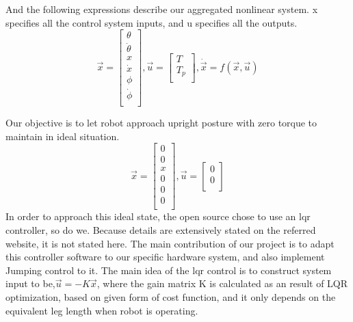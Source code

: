 \documentclass[12pt]{article}
\begin{document}
            And the following expressions describe our aggregated nonlinear system. x specifies all the control system inputs, and u specifies all the outputs.
            \[
                \vec{x}=\begin{bmatrix}\theta\\\dot{\theta}\\x\\ \dot{x}\\\phi\\ \dot{\phi}\\\end{bmatrix},\vec{u}=\begin{bmatrix}T\\T_p\\\end{bmatrix} ,\dot{\vec{x}}=f(\vec{x},\vec{u})
            \]
            
            Our objective is to let robot approach upright posture with zero torque to maintain in ideal situation.
            \[
                \vec{x}=\begin{bmatrix}0\\0\\x\\0\\0\\0\\\end{bmatrix},\vec{u}=\begin{bmatrix}0\\0\\\end{bmatrix}
            \]
            In order to approach this ideal state, the open source \cite{HarbinEngCtrlDesign2022} chose to use an \acrshort{lqr} controller, so do we. Because details are extensively stated on the referred website, it is not stated here. The main contribution of our project is to adapt this controller software to our specific hardware system, and also implement Jumping control to it. The main idea of the \acrshort{lqr} control is to construct system input to be,$\vec{u}=-K\vec{x}$, where the gain matrix K is calculated as an result of LQR optimization, based on given form of cost function, and it only depends on the equivalent leg length when robot is operating.\\\\
        
\end{document}

